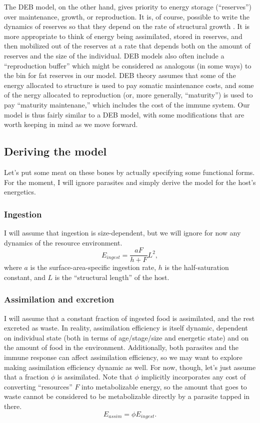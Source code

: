\documentclass[11pt,reqno,final,pdftex]{amsart}\usepackage[]{graphicx}\usepackage[]{color}
\theoremstyle{plain}
\numberwithin{equation}{part}
\begin{document}
The DEB model, on the other hand, gives priority to energy storage (``reserves'') over maintenance, growth, or reproduction.
It is, of course, possible to write the dynamics of reserves so that they depend on the rate of structural growth \citep[e.g., in][]{Hall2009}.
It is more appropriate to think of energy being assimilated, stored in reserves, and then mobilized out of the reserves at a rate that depends both on the amount of reserves and the size of the individual.
DEB models also often include a ``reproduction buffer'' which might be considered as analogous (in some ways) to the bin for fat reserves in our model.
DEB theory assumes that some of the energy allocated to structure is used to pay somatic maintenance costs, and some of the nergy allocated to reproduction (or, more generally, ``maturity'') is used to pay ``maturity maintenane,'' which includes the cost of the immune system.
Our model is thus fairly similar to a DEB model, with some modifications that are worth keeping in mind as we move forward.

\subsection*{Deriving the model}
Let's put some meat on these bones by actually specifying some functional forms.
For the moment, I will ignore parasites and simply derive the model for the host's energetics.

\subsubsection*{Ingestion}
I will assume that ingestion is size-dependent, but we will ignore for now any dynamics of the resource environment.
\begin{equation}
E_{ingest} = \frac{a F}{h + F} L^2,
\end{equation}
where $a$ is the surface-area-specific ingestion rate, $h$ is the half-saturation constant, and $L$ is the ``structural length'' of the host.

\subsubsection*{Assimilation and excretion}
I will assume that a constant fraction of ingested food is assimilated, and the rest excreted as waste.
In reality, assimilation efficiency is itself dynamic, dependent on individual state (both in terms of age/stage/size and energetic state) and on the amount of food in the environment.
Additionally, both parasites and the immune response can affect assimilation efficiency, so we may want to explore making assimilation efficiency dynamic as well.
For now, though, let's just assume that a fraction $\phi$ is assimilated.
Note that $\phi$ implicitly incorporates any cost of converting ``resources'' $F$ into metabolizable energy, so the amount that goes to waste cannot be considered to be metabolizable directly by a parasite tapped in there.
\begin{equation}
E_{assim} = \phi E_{ingest}.
\end{equation}
\end{document}
